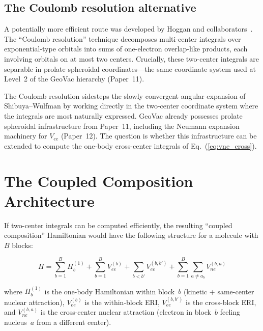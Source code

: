 \documentclass[aps,pra,twocolumn,superscriptaddress,longbibliography]{revtex4-2}
\begin{document}
\subsection{The Coulomb resolution alternative}

A potentially more efficient route was developed by Hoggan and
collaborators~\cite{hoggan2011}.  The ``Coulomb resolution'' technique
decomposes multi-center integrals over exponential-type orbitals into
sums of one-electron overlap-like products, each involving orbitals on
at most two centers.  Crucially, these two-center integrals are
separable in prolate spheroidal coordinates---the same coordinate
system used at Level~2 of the GeoVac hierarchy (Paper~11).

The Coulomb resolution sidesteps the slowly convergent angular
expansion of Shibuya--Wulfman by working directly in the two-center
coordinate system where the integrals are most naturally expressed.
GeoVac already possesses prolate spheroidal infrastructure from
Paper~11, including the Neumann expansion machinery for $V_{ee}$
(Paper~12).  The question is whether this infrastructure can be
extended to compute the one-body cross-center integrals of
Eq.~(\ref{eq:vne_cross}).


\section{The Coupled Composition Architecture}
\label{sec:architecture}

If two-center integrals can be computed efficiently, the resulting
``coupled composition'' Hamiltonian would have the following structure
for a molecule with $B$ blocks:

\begin{equation}
\label{eq:coupled}
H = \sum_{b=1}^{B} H_b^{(1)} + \sum_{b=1}^{B} V_{ee}^{(b)} +
\sum_{b < b'} V_{ee}^{(b,b')} + \sum_{b=1}^{B} \sum_{a \ne a_b}
V_{ne}^{(b,a)}
\end{equation}

where $H_b^{(1)}$ is the one-body Hamiltonian within block~$b$
(kinetic + same-center nuclear attraction), $V_{ee}^{(b)}$ is the
within-block ERI, $V_{ee}^{(b,b')}$ is the cross-block ERI, and
$V_{ne}^{(b,a)}$ is the cross-center nuclear attraction (electron in
block~$b$ feeling nucleus~$a$ from a different center).
\end{document}
